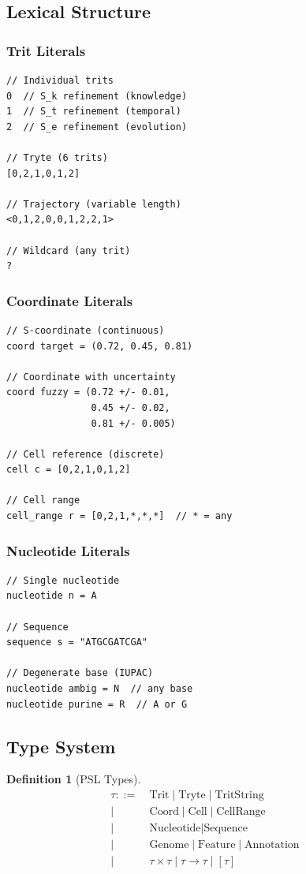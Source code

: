 \documentclass[twocolumn,10pt]{article}
\newtheorem{definition}[theorem]{Definition}
\theoremstyle{remark}
\begin{document}
\subsection{Lexical Structure}

\subsubsection{Trit Literals}
\begin{lstlisting}[style=tritcode]
// Individual trits
0  // S_k refinement (knowledge)
1  // S_t refinement (temporal)
2  // S_e refinement (evolution)

// Tryte (6 trits)
[0,2,1,0,1,2]

// Trajectory (variable length)
<0,1,2,0,0,1,2,2,1>

// Wildcard (any trit)
?
\end{lstlisting}

\subsubsection{Coordinate Literals}
\begin{lstlisting}[style=tritcode]
// S-coordinate (continuous)
coord target = (0.72, 0.45, 0.81)

// Coordinate with uncertainty
coord fuzzy = (0.72 +/- 0.01,
               0.45 +/- 0.02,
               0.81 +/- 0.005)

// Cell reference (discrete)
cell c = [0,2,1,0,1,2]

// Cell range
cell_range r = [0,2,1,*,*,*]  // * = any
\end{lstlisting}

\subsubsection{Nucleotide Literals}
\begin{lstlisting}[style=tritcode]
// Single nucleotide
nucleotide n = A

// Sequence
sequence s = "ATGCGATCGA"

// Degenerate base (IUPAC)
nucleotide ambig = N  // any base
nucleotide purine = R  // A or G
\end{lstlisting}

\subsection{Type System}

\begin{definition}[PSL Types]
\begin{align}
\tau ::=\ & \text{Trit} \mid \text{Tryte} \mid \text{TritString} \\
       \mid\ & \text{Coord} \mid \text{Cell} \mid \text{CellRange} \\
       \mid\ & \text{Nucleotide} \mid \text{Sequence} \\
       \mid\ & \text{Genome} \mid \text{Feature} \mid \text{Annotation} \\
       \mid\ & \tau \times \tau \mid \tau \to \tau \mid [\tau]
\end{align}
\end{definition}
\end{document}
